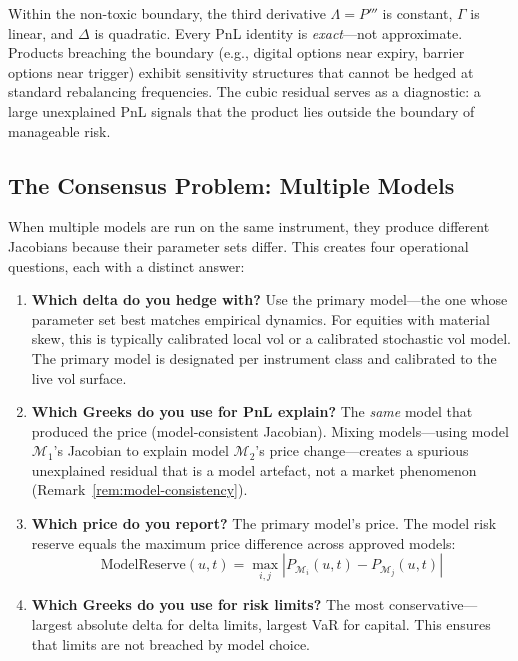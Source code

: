 \documentclass[11pt,a4paper]{article}
\begin{document}
Within the non-toxic boundary, the third derivative $\Lambda = P'''$ is constant, $\Gamma$ is linear, and $\Delta$ is quadratic.  Every PnL identity is \emph{exact}---not approximate.  Products breaching the boundary (e.g., digital options near expiry, barrier options near trigger) exhibit sensitivity structures that cannot be hedged at standard rebalancing frequencies.  The cubic residual serves as a diagnostic: a large unexplained PnL signals that the product lies outside the boundary of manageable risk.

\subsection{The Consensus Problem: Multiple Models}
\label{sec:consensus}

When multiple models are run on the same instrument, they produce different Jacobians because their parameter sets differ.  This creates four operational questions, each with a distinct answer:

\begin{enumerate}
\item \textbf{Which delta do you hedge with?}  Use the primary model---the one whose parameter set best matches empirical dynamics.  For equities with material skew, this is typically calibrated local vol or a calibrated stochastic vol model.  The primary model is designated per instrument class and calibrated to the live vol surface.

\item \textbf{Which Greeks do you use for PnL explain?}  The \emph{same} model that produced the price (model-consistent Jacobian).  Mixing models---using model $\mathcal{M}_1$'s Jacobian to explain model $\mathcal{M}_2$'s price change---creates a spurious unexplained residual that is a model artefact, not a market phenomenon (Remark~\ref{rem:model-consistency}).

\item \textbf{Which price do you report?}  The primary model's price.  The model risk reserve equals the maximum price difference across approved models:
\[
\text{ModelReserve}(u, t) = \max_{i,j} |P_{\mathcal{M}_i}(u, t) - P_{\mathcal{M}_j}(u, t)|
\]

\item \textbf{Which Greeks do you use for risk limits?}  The most conservative---largest absolute delta for delta limits, largest VaR for capital.  This ensures that limits are not breached by model choice.
\end{enumerate}
\end{document}
